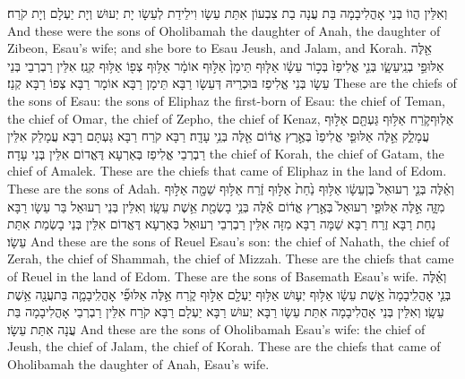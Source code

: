 {וְאִלֵּין הֲווֹ בְּנֵי אָהֳלִיבָמָה בַּת עֲנָה בַת צִבְעוֹן אִתַּת עֵשָׂו וִילֵידַת לְעֵשָׂו יָת יְעוּשׁ וְיָת יַעְלָם וְיָת קֹרַח׃}
{And these were the sons of Oholibamah the daughter of Anah, the daughter of Zibeon, Esau’s wife; and she bore to Esau Jeush, and Jalam, and Korah.}{}
{אֵ֖לֶּה אַלּוּפֵ֣י בְנֵֽי\maqqaf עֵשָׂ֑ו בְּנֵ֤י אֱלִיפַז֙ בְּכ֣וֹר עֵשָׂ֔ו אַלּ֤וּף תֵּימָן֙ אַלּ֣וּף אוֹמָ֔ר אַלּ֥וּף צְפ֖וֹ אַלּ֥וּף קְנַֽז׃}
{אִלֵּין רַבְרְבֵי בְּנֵי עֵשָׂו בְּנֵי אֱלִיפַז בּוּכְרֵיהּ דְּעֵשָׂו רַבָּא תֵּימָן רַבָּא אוֹמָר רַבָּא צְפוֹ רַבָּא קְנַז׃}
{These are the chiefs of the sons of Esau: the sons of Eliphaz the first-born of Esau: the chief of Teman, the chief of Omar, the chief of Zepho, the chief of Kenaz,}{}
{אַלּֽוּף\maqqaf קֹ֛רַח אַלּ֥וּף גַּעְתָּ֖ם אַלּ֣וּף עֲמָלֵ֑ק אֵ֣לֶּה אַלּוּפֵ֤י אֱלִיפַז֙ בְּאֶ֣רֶץ אֱד֔וֹם אֵ֖לֶּה בְּנֵ֥י עָדָֽה׃}
{רַבָּא קֹרַח רַבָּא גַּעְתָּם רַבָּא עֲמָלֵק אִלֵּין רַבְרְבֵי אֱלִיפַז בְּאַרְעָא דֶּאֱדוֹם אִלֵּין בְּנֵי עָדָה׃}
{the chief of Korah, the chief of Gatam, the chief of Amalek. These are the chiefs that came of Eliphaz in the land of Edom. These are the sons of Adah.}{}
{וְאֵ֗לֶּה בְּנֵ֤י רְעוּאֵל֙ בֶּן\maqqaf עֵשָׂ֔ו אַלּ֥וּף נַ֙חַת֙ אַלּ֣וּף זֶ֔רַח אַלּ֥וּף שַׁמָּ֖ה אַלּ֣וּף מִזָּ֑ה אֵ֣לֶּה אַלּוּפֵ֤י רְעוּאֵל֙ בְּאֶ֣רֶץ אֱד֔וֹם אֵ֕לֶּה בְּנֵ֥י בָשְׂמַ֖ת אֵ֥שֶׁת עֵשָֽׂו׃}
{וְאִלֵּין בְּנֵי רְעוּאֵל בַּר עֵשָׂו רַבָּא נַחַת רַבָּא זֶרַח רַבָּא שַׁמָּה רַבָּא מִזָּה אִלֵּין רַבְרְבֵי רְעוּאֵל בְּאַרְעָא דֶּאֱדוֹם אִלֵּין בְּנֵי בָשְׂמַת אִתַּת עֵשָׂו׃}
{And these are the sons of Reuel Esau’s son: the chief of Nahath, the chief of Zerah, the chief of Shammah, the chief of Mizzah. These are the chiefs that came of Reuel in the land of Edom. These are the sons of Basemath Esau’s wife.}{}
{וְאֵ֗לֶּה בְּנֵ֤י אׇהֳלִֽיבָמָה֙ אֵ֣שֶׁת עֵשָׂ֔ו אַלּ֥וּף יְע֛וּשׁ אַלּ֥וּף יַעְלָ֖ם אַלּ֣וּף קֹ֑רַח אֵ֣לֶּה אַלּוּפֵ֞י אׇהֳלִֽיבָמָ֛ה בַּת\maqqaf עֲנָ֖ה אֵ֥שֶׁת עֵשָֽׂו׃}
{וְאִלֵּין בְּנֵי אָהֳלִיבָמָה אִתַּת עֵשָׂו רַבָּא יְעוּשׁ רַבָּא יַעְלָם רַבָּא קֹרַח אִלֵּין רַבְרְבֵי אָהֳלִיבָמָה בַּת עֲנָה אִתַּת עֵשָׂו׃}
{And these are the sons of Oholibamah Esau’s wife: the chief of Jeush, the chief of Jalam, the chief of Korah. These are the chiefs that came of Oholibamah the daughter of Anah, Esau’s wife.}{}
